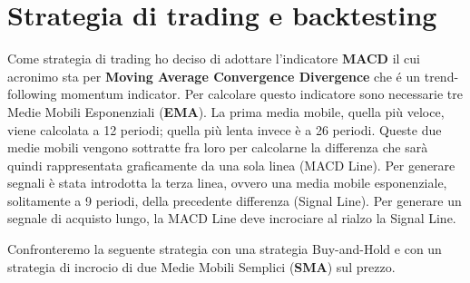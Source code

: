 \documentclass{report}
\begin{document}
\chapter{Strategia di trading e backtesting}
Come strategia di trading ho deciso di adottare l'indicatore \textbf{MACD} il cui acronimo sta per \textbf{Moving Average Convergence Divergence} che é un trend-following momentum indicator. Per calcolare questo indicatore sono necessarie tre Medie Mobili Esponenziali (\textbf{EMA}). La prima media mobile, quella più veloce, viene calcolata a 12 periodi; quella più lenta invece è a 26 periodi. Queste due medie mobili vengono sottratte fra loro per calcolarne la differenza che sarà quindi rappresentata graficamente da una sola linea (MACD Line). Per generare segnali è stata introdotta la terza linea, ovvero una media mobile esponenziale, solitamente a 9 periodi, della precedente differenza (Signal Line). Per generare un segnale di acquisto lungo, la MACD Line deve incrociare al rialzo la Signal Line.

Confronteremo la seguente strategia con una strategia Buy-and-Hold e con un strategia di incrocio di due Medie Mobili Semplici (\textbf{SMA}) sul prezzo. 
\end{document}
